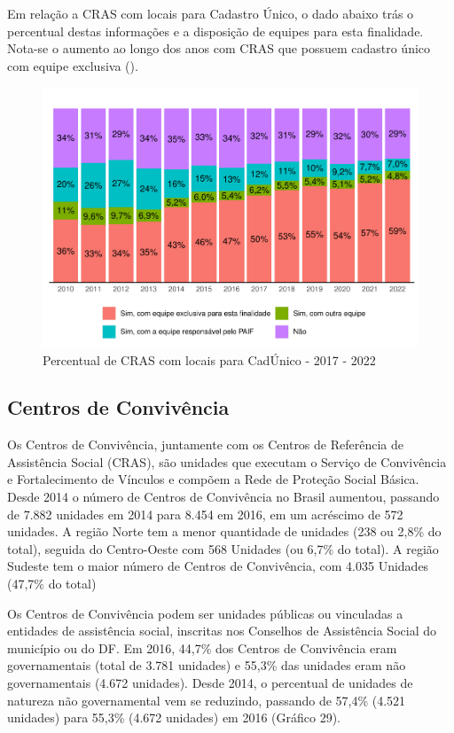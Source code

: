\documentclass[
  brazilian]{report}
\begin{document}
Em relação a CRAS com locais para Cadastro Único, o dado abaixo trás o
percentual destas informações e a disposição de equipes para esta
finalidade. Nota-se o aumento ao longo dos anos com CRAS que possuem
cadastro único com equipe exclusiva ().

\begin{figure}
\includegraphics{Censo-SUAS-2022_files/figure-latex/equip-cadunico-cras-1} \caption[Percentual de CRAS com locais para CadÚnico - 2017 - 2022]{Percentual de CRAS com locais para CadÚnico - 2017 - 2022}\label{fig:equip-cadunico-cras}
\end{figure}

\hypertarget{centros-de-convivuxeancia}{%
\subsection{Centros de Convivência}\label{centros-de-convivuxeancia}}

Os Centros de Convivência, juntamente com os Centros de Referência de
Assistência Social (CRAS), são unidades que executam o Serviço de
Convivência e Fortalecimento de Vínculos e compõem a Rede de Proteção
Social Básica. Desde 2014 o número de Centros de Convivência no Brasil
aumentou, passando de 7.882 unidades em 2014 para 8.454 em 2016, em um
acréscimo de 572 unidades. A região Norte tem a menor quantidade de
unidades (238 ou 2,8\% do total), seguida do Centro-Oeste com 568
Unidades (ou 6,7\% do total). A região Sudeste tem o maior número de
Centros de Convivência, com 4.035 Unidades (47,7\% do total)

Os Centros de Convivência podem ser unidades públicas ou vinculadas a
entidades de assistência social, inscritas nos Conselhos de Assistência
Social do município ou do DF. Em 2016, 44,7\% dos Centros de Convivência
eram governamentais (total de 3.781 unidades) e 55,3\% das unidades eram
não governamentais (4.672 unidades). Desde 2014, o percentual de
unidades de natureza não governamental vem se reduzindo, passando de
57,4\% (4.521 unidades) para 55,3\% (4.672 unidades) em 2016 (Gráfico
29).
\end{document}
